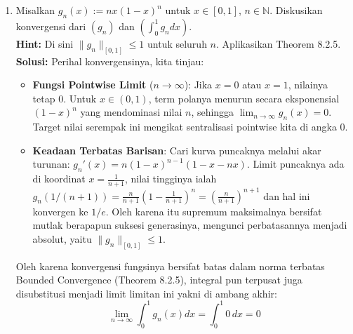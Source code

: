﻿\documentclass{article}
\begin{document}
\begin{enumerate}
        \vspace{0.5cm}
  \item[15.] Misalkan $g_n(x) := nx(1 - x)^n$ untuk $x \in [0, 1]$, $n \in \mathbb{N}$. Diskusikan konvergensi dari $(g_n)$ dan $(\int_0^1 g_n dx)$.\\
        \textbf{Hint:} Di sini $\|g_n\|_{[0, 1]} \le 1$ untuk seluruh $n$. Aplikasikan Theorem 8.2.5.\\
        \textbf{Solusi:}
        Perihal konvergensinya, kita tinjau:
        \begin{itemize}
          \item \textbf{Fungsi Pointwise Limit} ($n \to \infty$): Jika $x=0$ atau $x=1$, nilainya tetap $0$. Untuk $x \in (0,1)$, term polanya menurun secara eksponensial $(1-x)^n$ yang mendominasi nilai $n$, sehingga $\lim_{n \to \infty} g_n(x) = 0$. Target nilai serempak ini mengikat sentralisasi pointwise kita di angka 0.
          \item \textbf{Keadaan Terbatas Barisan}: Cari kurva puncaknya melalui akar turunan: $g_n'(x) = n(1-x)^{n-1}(1 - x - nx)$. Limit puncaknya ada di koordinat $x = \frac{1}{n+1}$, nilai tingginya ialah $g_n(1/(n+1)) = \frac{n}{n+1} (1 - \frac{1}{n+1})^n = (\frac{n}{n+1})^{n+1}$ dan hal ini konvergen ke $1/e$. Oleh karena itu supremum maksimalnya bersifat mutlak berapapun suksesi generasinya, mengunci perbatasannya menjadi absolut, yaitu $\|g_n\|_{[0,1]} \le 1$.
        \end{itemize}
        Oleh karena konvergensi fungsinya bersifat batas dalam norma terbatas Bounded Convergence (Theorem 8.2.5), integral pun terpusat juga disubstitusi menjadi limit limitan ini yakni di ambang akhir:
        \[ \lim_{n \to \infty} \int_0^1 g_n(x) dx = \int_0^1 0 \, dx = 0 \]


\end{enumerate}
\end{document}
